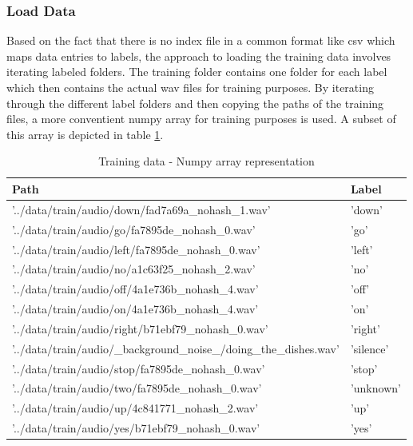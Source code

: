\documentclass{article}
\theoremstyle{definition}
\theoremstyle{remark}
\begin{document}
\subsubsection{Load Data}

Based on the fact that there is no index file in a common format like csv which maps data entries to labels, the approach to loading the training data involves iterating labeled folders. The training folder contains one folder for each label which then contains the actual wav files for training purposes. By iterating through the different label folders and then copying the paths of the training files, a more conventient numpy array for training purposes is used. A subset of this array is depicted in table \ref{tab:numpy_array_representation}.


\begin{table}[h!]
\center
\begin{tabular}{|l|l|}
\hline
Path & Label \\ \hline
'../data/train/audio/down/fad7a69a\_nohash\_1.wav' & 'down'  \\ \hline
'../data/train/audio/go/fa7895de\_nohash\_0.wav' & 'go'  \\ \hline
'../data/train/audio/left/fa7895de\_nohash\_0.wav'  & 'left'  \\ \hline
'../data/train/audio/no/a1c63f25\_nohash\_2.wav'   & 'no'  \\ \hline
'../data/train/audio/off/4a1e736b\_nohash\_4.wav'  & 'off'  \\ \hline
'../data/train/audio/on/4a1e736b\_nohash\_4.wav'  & 'on'  \\ \hline
'../data/train/audio/right/b71ebf79\_nohash\_0.wav'      & 'right'  \\ \hline
'../data/train/audio/\_background\_noise\_/doing\_the\_dishes.wav'  & 'silence'   \\ \hline
'../data/train/audio/stop/fa7895de\_nohash\_0.wav' & 'stop'  \\ \hline
'../data/train/audio/two/fa7895de\_nohash\_0.wav'& 'unknown'  \\ \hline
'../data/train/audio/up/4c841771\_nohash\_2.wav' & 'up'  \\ \hline
'../data/train/audio/yes/b71ebf79\_nohash\_0.wav' & 'yes'  \\ \hline
\end{tabular}
\caption{Training data - Numpy array representation}
\label{tab:numpy_array_representation}
\end{table}
\end{document}
